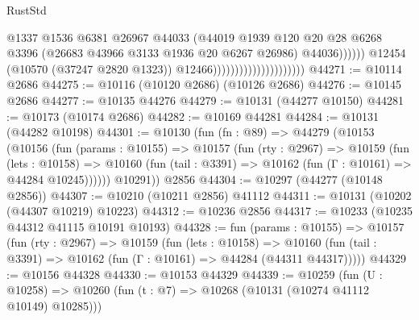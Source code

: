 \begin{lexlean}{RustStd}
\begin{coremodule}
                                                        @1337
                                                        @1536
                                                        @6381
                                                        @26967
                                                        @44033
                                                        (@44019
                                                          @1939
                                                          @120
                                                          @20
                                                          @28
                                                          @6268
                                                          @3396
                                                          (@26683
                                                            @43966
                                                            @3133
                                                            @1936
                                                            @20
                                                            @6267
                                                            @26986)
                                                          @44036))))))
                                              @12454
                                              (@10570 (@37247 @2820 @1323))
                                              @12466)))))))))))))))))))))
@44271 := @10114 @2686
@44275 := @10116 (@10120 @2686) (@10126 @2686)
@44276 := @10145 @2686
@44277 := @10135 @44276
@44279 := @10131 (@44277 @10150)
@44281 := @10173 (@10174 @2686)
@44282 := @10169 @44281
@44284 := @10131 (@44282 @10198)
@44301 := @10130
    (fun (fn : @89) =>
    @44279
      (@10153
        (@10156
          (fun (params : @10155) =>
          @10157
            (fun (rty : @2967) =>
            @10159
              (fun (lets : @10158) =>
              @10160 (fun (tail : @3391) => @10162 (fun (Γ : @10161) => @44284 @10245))))))
        @10291))
    @2856
@44304 := @10297 (@44277 (@10148 @2856))
@44307 := @10210 (@10211 @2856) @41112
@44311 := @10131 (@10202 (@44307 @10219) @10223)
@44312 := @10236 @2856
@44317 := @10233 (@10235 @44312 @41115 @10191 @10193)
@44328 := fun (params : @10155) =>
  @10157
    (fun (rty : @2967) =>
    @10159
      (fun (lets : @10158) =>
      @10160 (fun (tail : @3391) => @10162 (fun (Γ : @10161) => @44284 (@44311 @44317)))))
@44329 := @10156 @44328
@44330 := @10153 @44329
@44339 := @10259
    (fun (U : @10258) => @10260 (fun (t : @7) => @10268 (@10131 (@10274 @41112 @10149) @10285)))

\end{coremodule}
\end{lexlean}
